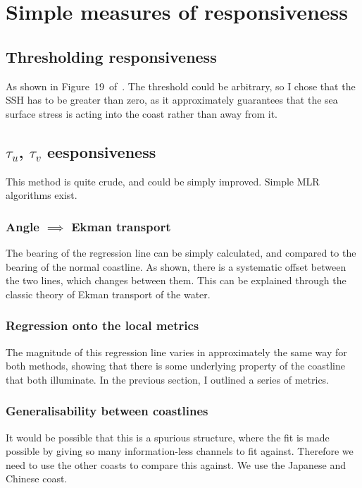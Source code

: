 \section{Simple measures of responsiveness}
\label{sec:3_ORCA12_REG.tex}

\subsection{Thresholding responsiveness}
As shown in Figure~19~of~\cite{ZannaPreprint}.
The threshold could be arbitrary,
so I chose that the SSH has to be greater than zero,
as it approximately guarantees that the sea surface stress is acting into
the coast rather than away from it.


\subsection{$\tau_u$, $\tau_v$ eesponsiveness}
This method is quite crude, and could be simply improved.
Simple MLR algorithms exist.

\subsubsection{Angle $\implies$ Ekman transport}
The bearing of the regression line can be simply calculated,
and compared to the bearing of the normal coastline.
As shown, there is a systematic offset between the two lines,
which changes between them. This can be explained through the
classic theory of Ekman transport of the water.

\subsubsection{Regression onto the local metrics}
The magnitude of this regression line varies in approximately the same
way for both methods, showing that there is some underlying property of the
coastline that both illuminate. In the previous section, I outlined
a series of metrics.

\subsubsection{Generalisability between coastlines}
It would be possible that this is a spurious structure, where the fit
is made possible by giving so many information-less channels to fit against.
Therefore we need to use the other coasts to compare this against.
We use the Japanese and Chinese coast.
